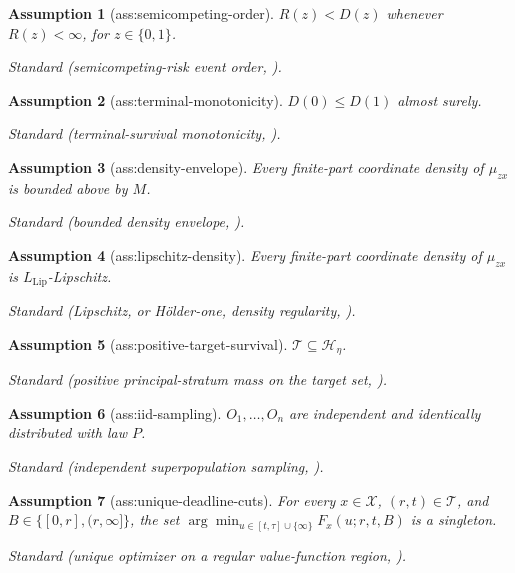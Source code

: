 \documentclass{article}
\newtheorem{assumption}{Assumption}
\begin{document}
\begin{assumption}[ass:semicompeting-order]\label{ass:semicompeting-order}
\(R(z)<D(z)\) whenever \(R(z)<\infty\), for \(z\in\{0,1\}\).
\par\smallskip\noindent\emph{Standard} (semicompeting-risk event order, \cite{comment2025survivor}).
\end{assumption}

\begin{assumption}[ass:terminal-monotonicity]\label{ass:terminal-monotonicity}
\(D(0)\le D(1)\) almost surely.
\par\smallskip\noindent\emph{Standard} (terminal-survival monotonicity, \cite{yangDing2018survival}).
\end{assumption}

\begin{assumption}[ass:density-envelope]\label{ass:density-envelope}
Every finite-part coordinate density of \(\mu_{zx}\) is bounded above by \(M\).
\par\smallskip\noindent\emph{Standard} (bounded density envelope, \cite{tsybakov2009nonparametric}).
\end{assumption}

\begin{assumption}[ass:lipschitz-density]\label{ass:lipschitz-density}
Every finite-part coordinate density of \(\mu_{zx}\) is \(L_{\mathrm{Lip}}\)-Lipschitz.
\par\smallskip\noindent\emph{Standard} (Lipschitz, or Hölder-one, density regularity, \cite{tsybakov2009nonparametric}).
\end{assumption}

\begin{assumption}[ass:positive-target-survival]\label{ass:positive-target-survival}
\(\mathcal T\subseteq\mathcal H_\eta\).
\par\smallskip\noindent\emph{Standard} (positive principal-stratum mass on the target set, \cite{comment2025survivor}).
\end{assumption}

\begin{assumption}[ass:iid-sampling]\label{ass:iid-sampling}
\(O_1,\ldots,O_n\) are independent and identically distributed with law \(P\).
\par\smallskip\noindent\emph{Standard} (independent superpopulation sampling, \cite{vanderVaart1998asymptotic}).
\end{assumption}

\begin{assumption}[ass:unique-deadline-cuts]\label{ass:unique-deadline-cuts}
For every \(x\in\mathcal X\), \((r,t)\in\mathcal T\), and \(B\in\{[0,r],(r,\infty]\}\), the set \(\arg\min_{u\in[t,\tau]\cup\{\infty\}}F_x(u;r,t,B)\) is a singleton.
\par\smallskip\noindent\emph{Standard} (unique optimizer on a regular value-function region, \cite{firpoGalvaoParker2023uniform}).
\end{assumption}
\end{document}
